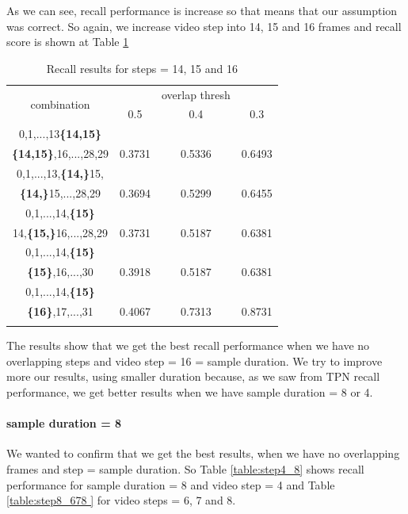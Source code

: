 \documentclass{report}
\begin{document}
As we can see, recall performance is increase so that means that our assumption was correct. So again, we increase video step into 14, 15 and 16 frames
and recall score is shown at Table \ref{table:step14_16}
\begin{center}
\begin{longtable}{||c||c c c||}

  \hline
  \multirow{2}{5em}{combination} & {} &overlap thresh & {} \\
                                    &  0.5  &  0.4 &  0.3 \\         
  \hline  \hline
  0,1,...,13\textbf{\{14,15\}}                & {} & {} & {} \\
  \textbf{\{14,15\}},16,...,28,29                & 0.3731 & 0.5336 & 0.6493 \\
  \hline     \hline                          

  0,1,...,13,\textbf{\{14,\}}15,              & {} & {} & {} \\
  \textbf{\{14,\}}15,...,28,29                & 0.3694   & 0.5299 & 0.6455 \\
  \hline                          
  0,1,...,14,\textbf{\{15\}}                  & {} & {} & {} \\
  14,\textbf{\{15,\}}16,...,28,29             & 0.3731   & 0.5187 & 0.6381 \\
  \hline  \hline

  0,1,...,14,\textbf{\{15\}}                & {} & {} & {} \\
  \textbf{\{15\}},16,...,30                 & 0.3918 & 0.5187 & 0.6381 \\
  \hline     \hline                          
  0,1,...,14,\textbf{\{15\}}                & {} & {} & {} \\
  \textbf{\{16\}},17,...,31                 & 0.4067 & 0.7313 & 0.8731 \\
  \hline                          
  \caption{Recall results for steps = 14, 15 and 16}
  \label{table:step14_16}
\end{longtable} 
\end{center}

The results show that we get the best recall performance when we have no overlapping steps and video step = 16 = sample duration. We try to improve
more our results, using smaller duration because, as we saw from TPN recall performance, we get better results when we have sample duration = 8 or 4.

\paragraph{sample duration = 8}
We wanted to confirm that we get the best results, when we have no overlapping frames and step = sample duration. So Table \ref{table:step4_8}
shows recall performance for sample duration = 8 and video step = 4 and Table \ref{table:step8_678 } for video steps = 6, 7 and 8.
\end{document}
